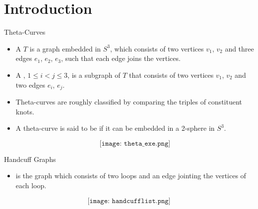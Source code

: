 \section{Introduction}
\begin{frame}{Theta-Curves}
	\begin{itemize}
		\item A  $T$ is a graph embedded in $S^3$,
		which consists of two vertices $v_1$, $v_2$
		and three edges $e_1$, $e_2$, $e_3$,
		such that each edge joins the vertices.
		\item A , $1 \le i < j \le 3$, is a subgraph of $T$
		that consists of two vertices $v_1$, $v_2$ and two edges $e_i$, $e_j$.
		
		\item Theta-curves are roughly classified by comparing the triples of constituent knots.
		
		\item A theta-curve is said to be  if it can be embedded in a 2-sphere in $S^3$.

		$$\texttt{[image: theta\_exe.png]}$$
	\end{itemize}
\end{frame}

\begin{frame}{Handcuff Graphs}
	\begin{itemize}
		\item {} is the graph which consists of two loops and an edge jointing the vertices of each loop.
	\end{itemize}

	$$\texttt{[image: handcufflist.png]}$$
\end{frame}

